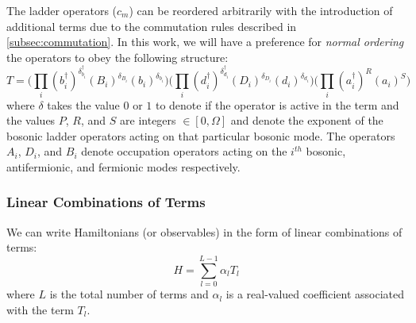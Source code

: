 The ladder operators ($c_m$) can be reordered arbitrarily with the introduction of additional terms due to the commutation rules described in \ref{subsec:commutation}.
In this work, we will have a preference for \textit{normal ordering}  the operators to obey the following structure:
\begin{equation}
    T = \Big( \prod_i (b_i^\dagger)^{\delta_{b_i}^{\dagger}} (B_i)^{\delta_{B_i}} (b_i)^{\delta_{b_i}} \Big) \Big( \prod_i (d_i^\dagger)^{\delta_{d_i}^{\dagger}} (D_i)^{\delta_{D_i}} (d_i)^{\delta_{d_i}} \Big)   \Big( \prod_i (a_i^\dagger)^R(a_i)^S \Big) 
\end{equation}
where $\delta$ takes the value $0$ or $1$ to denote if the operator is active in the term and the values $P$, $R$, and $S$ are integers $\in [0, \Omega]$ and denote the exponent of the bosonic ladder operators acting on that particular bosonic mode.
The operators $A_i$, $D_i$, and $B_i$ denote occupation operators acting on the $i^{th}$ bosonic, antifermionic, and fermionic modes respectively.


\subsubsection{Linear Combinations of Terms}

We can write Hamiltonians (or observables) in the form of linear combinations of terms:
\begin{equation}
    \label{eq:lclo}
    H = \sum_{l=0}^{L-1} \alpha_l T_l
\end{equation}
where $L$ is the total number of terms and $\alpha_l$ is a real-valued coefficient associated with the term $T_l$.